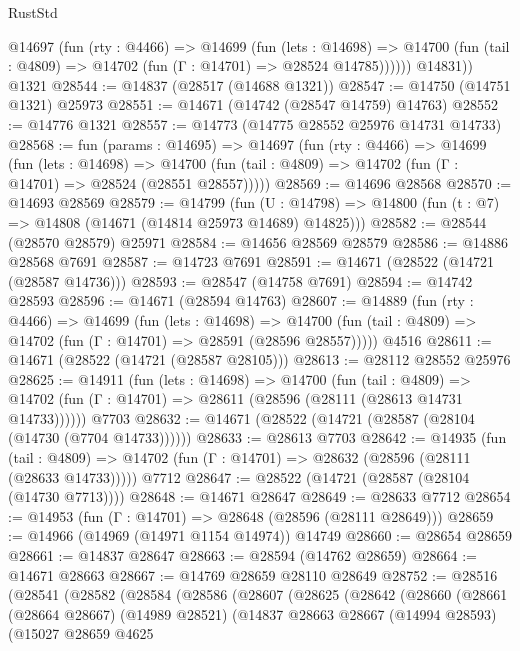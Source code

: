 \begin{lexlean}{RustStd}
\begin{coremodule}
          @14697
            (fun (rty : @4466) =>
            @14699
              (fun (lets : @14698) =>
              @14700 (fun (tail : @4809) => @14702 (fun (Γ : @14701) => @28524 @14785))))))
        @14831))
    @1321
@28544 := @14837 (@28517 (@14688 @1321))
@28547 := @14750 (@14751 @1321) @25973
@28551 := @14671 (@14742 (@28547 @14759) @14763)
@28552 := @14776 @1321
@28557 := @14773 (@14775 @28552 @25976 @14731 @14733)
@28568 := fun (params : @14695) =>
  @14697
    (fun (rty : @4466) =>
    @14699
      (fun (lets : @14698) =>
      @14700 (fun (tail : @4809) => @14702 (fun (Γ : @14701) => @28524 (@28551 @28557)))))
@28569 := @14696 @28568
@28570 := @14693 @28569
@28579 := @14799
    (fun (U : @14798) => @14800 (fun (t : @7) => @14808 (@14671 (@14814 @25973 @14689) @14825)))
@28582 := @28544 (@28570 @28579) @25971
@28584 := @14656 @28569 @28579
@28586 := @14886 @28568 @7691
@28587 := @14723 @7691
@28591 := @14671 (@28522 (@14721 (@28587 @14736)))
@28593 := @28547 (@14758 @7691)
@28594 := @14742 @28593
@28596 := @14671 (@28594 @14763)
@28607 := @14889
    (fun (rty : @4466) =>
    @14699
      (fun (lets : @14698) =>
      @14700 (fun (tail : @4809) => @14702 (fun (Γ : @14701) => @28591 (@28596 @28557)))))
    @4516
@28611 := @14671 (@28522 (@14721 (@28587 @28105)))
@28613 := @28112 @28552 @25976
@28625 := @14911
    (fun (lets : @14698) =>
    @14700
      (fun (tail : @4809) =>
      @14702 (fun (Γ : @14701) => @28611 (@28596 (@28111 (@28613 @14731 @14733))))))
    @7703
@28632 := @14671 (@28522 (@14721 (@28587 (@28104 (@14730 (@7704 @14733))))))
@28633 := @28613 @7703
@28642 := @14935
    (fun (tail : @4809) => @14702 (fun (Γ : @14701) => @28632 (@28596 (@28111 (@28633 @14733)))))
    @7712
@28647 := @28522 (@14721 (@28587 (@28104 (@14730 @7713))))
@28648 := @14671 @28647
@28649 := @28633 @7712
@28654 := @14953 (fun (Γ : @14701) => @28648 (@28596 (@28111 @28649)))
@28659 := @14966 (@14969 (@14971 @1154 @14974)) @14749
@28660 := @28654 @28659
@28661 := @14837 @28647
@28663 := @28594 (@14762 @28659)
@28664 := @14671 @28663
@28667 := @14769 @28659 @28110 @28649
@28752 := @28516
    (@28541
      (@28582
        (@28584
          (@28586
            (@28607
              (@28625
                (@28642
                  (@28660
                    (@28661
                      (@28664 @28667)
                      (@14989 @28521)
                      (@14837
                        @28663
                        @28667
                        (@14994 @28593)
                        (@15027
                          @28659
                          @4625

\end{coremodule}
\end{lexlean}
